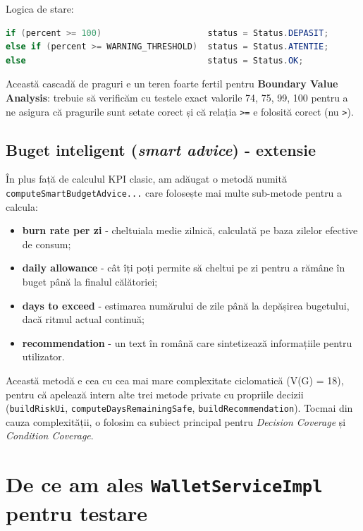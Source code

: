 Logica de stare:

\begin{lstlisting}[language=Java]
if (percent >= 100)                     status = Status.DEPASIT;
else if (percent >= WARNING_THRESHOLD)  status = Status.ATENTIE;
else                                    status = Status.OK;
\end{lstlisting}

Această cascadă de praguri e un teren foarte fertil pentru \textbf{Boundary Value Analysis}: trebuie să verificăm cu testele exact valorile 74, 75, 99, 100 pentru a ne asigura că pragurile sunt setate corect și că relația \texttt{>=} e folosită corect (nu \texttt{>}).

\subsection{Buget inteligent (\textit{smart advice}) - extensie}

În plus față de calculul KPI clasic, am adăugat o metodă numită \texttt{computeSmartBudgetAdvice...} care folosește mai multe sub-metode pentru a calcula:

\begin{itemize}
    \item \textbf{burn rate per zi} - cheltuiala medie zilnică, calculată pe baza zilelor efective de consum;
    \item \textbf{daily allowance} - cât îți poți permite să cheltui pe zi pentru a rămâne în buget până la finalul călătoriei;
    \item \textbf{days to exceed} - estimarea numărului de zile până la depășirea bugetului, dacă ritmul actual continuă;
    \item \textbf{recommendation} - un text în română care sintetizează informațiile pentru utilizator.
\end{itemize}

Această metodă e cea cu cea mai mare complexitate ciclomatică (V(G) = 18), pentru că apelează intern alte trei metode private cu propriile decizii (\texttt{buildRiskUi}, \texttt{computeDaysRemainingSafe}, \texttt{buildRecommendation}). Tocmai din cauza complexității, o folosim ca subiect principal pentru \textit{Decision Coverage} și \textit{Condition Coverage}.

\section{De ce am ales \texttt{WalletServiceImpl} pentru testare}

